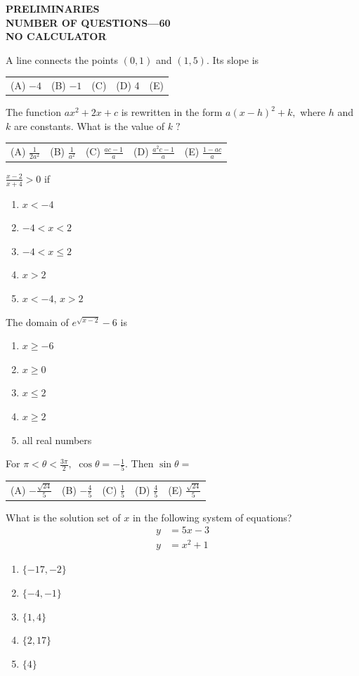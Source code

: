 \documentclass[letterstyle,12pt]{extarticle}
\newcounter{qcounter}
\newcommand{\choices}[5]{
\vspace{0.8em} 
\begin{enumerate}[label=(\Alph*)]
\setlength\itemsep{1em} 
\item
#1 
\item 
#2
\item
#3
\item
#4
\item
#5
\end{enumerate}
}
\newcommand{\choicesline}[5]{    
\vspace{2em} \break 
\begin{tabularx}{0.95 \textwidth} { 
>{\arraybackslash}X 
>{\arraybackslash}X 
>{\arraybackslash}X 
>{\arraybackslash}X 
>{\arraybackslash}X }
(A) \; #1
& 
(B) \; #2
& 
(C) \; #3
& 
(D) \; #4
&
(E) \; #5 
\end{tabularx}
\vspace{2em} \break
}
\newcommand{\ans}[1]{{\color{black} #1}}
\newenvironment{question}
    {\begin{minipage}{0.9 \textwidth}
        \item
    }
    { 
    \end{minipage} \vspace{4ex}
    }
\begin{document}
\begin{center}
    {\bf
    \MakeUppercase{Preliminaries\\[1ex]
    NUMBER OF QUESTIONS—60 \\[1ex] 
    NO CALCULATOR \\[5ex]
    }}
\end{center}

\begin{list}{\textbf{.}~}{}
\setlength\itemsep{3em}

\begin{question}
A line connects the points \((0, 1)\) and \((1, 5).\) Its slope is \\
\choicesline
{\(-4\)}
{\(-1\)}
{1}
{\ans 4}
{5}
\end{question}

\begin{question}
The function \(ax^2 + 2x + c\) is rewritten in the form \(a(x - h)^2 + k,\) where \(h\) and \(k\) are constants. What is the value of \(k \; ?\) \\
\choicesline
{\(\frac{1}{2a^2}\)}
{\(\frac{1}{a^2}\)}
{\ans{\(\frac{ac - 1}{a}\)}}
{\(\frac{a^2 c - 1}{a}\)}
{\(\frac{1 - ac}{a}\)}
\end{question}

\begin{question}
\(\frac{x - 2}{x + 4} > 0\) if \\
\choices
{\(x < -4\)}
{\(-4 < x < 2\)}
{\(-4 < x \leqslant 2\)}
{\(x > 2\)}
{\ans{\(x < -4, \, x > 2\)}}    
\end{question}

\begin{question} 
The domain of \(e^{\sqrt{x - 2}} - 6\) is \\
\choices
{\(x \geqslant -6\)}
{\(x \geqslant 0\)}
{\(x \leqslant 2\)}
{\ans{\(x \geqslant 2\)}}
{all real numbers}
\end{question} 

\begin{question} 
For \(\pi < \theta < \frac{3 \pi}{2},\) \(\cos \theta = -\frac{1}{5}.\) Then \(\sin \theta = \) \\
\choicesline
{\ans{\(-\frac{\sqrt{24}}{5}\)}}
{\(-\frac{4}{5}\)}
{\(\frac{1}{5}\)}
{\(\frac{4}{5}\)}
{\(\frac{\sqrt{24}}{5}\)}
\end{question} 

\begin{question}
What is the solution set of \(x\) in the following system of equations?
\[
\begin{aligned}
    y &= 5x - 3 \\
    y &= x^2 + 1
\end{aligned}
\]
\choices
{\(\{-17, -2\}\)}
{\(\{-4, -1\}\)}
{\ans{\(\{1, 4\}\)}}
{\(\{2, 17\}\)}
{\(\{4\}\)}
\end{question}


\end{list}
\end{document}

